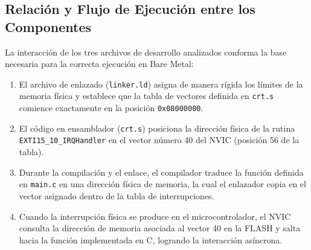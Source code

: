 \subsection{Relación y Flujo de Ejecución entre los Componentes}
\label{sec.ej1:relacion}

La interacción de los tres archivos de desarrollo analizados conforma la base necesaria para la correcta ejecución
en Bare Metal:
\begin{enumerate}
    \item El archivo de enlazado (\texttt{linker.ld}) asigna de manera rígida los límites de la memoria física y
    establece que la tabla de vectores definida en \texttt{crt.s} comience exactamente en la posición \texttt{0x08000000}.
    \item El código en ensamblador (\texttt{crt.s}) posiciona la dirección física de la rutina
    \texttt{EXTI15\_10\_}\allowbreak\texttt{IRQHandler} en el vector número 40 del NVIC (posición 56 de la tabla).
    \item Durante la compilación y el enlace, el compilador traduce la función definida en \texttt{main.c} en una
    dirección física de memoria, la cual el enlazador copia en el vector asignado dentro de la tabla de interrupciones.
    \item Cuando la interrupción física se produce en el microcontrolador, el NVIC consulta la dirección de memoria
    asociada al vector 40 en la FLASH y salta hacia la función implementada en C, logrando la interacción asíncrona.
\end{enumerate}

